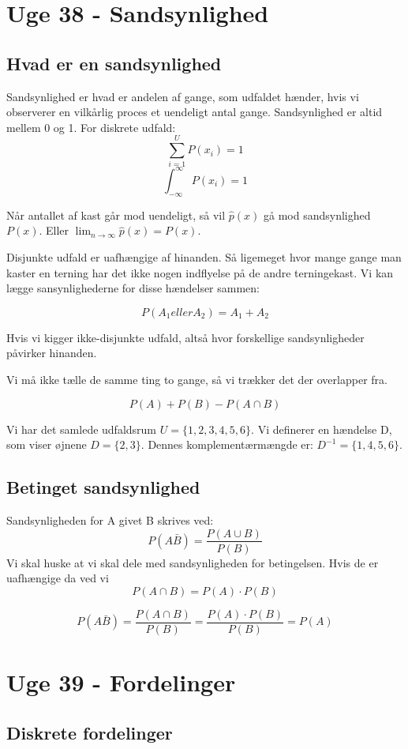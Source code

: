 \documentclass{article}
\begin{document}
    \newpage
\section{Uge 38 - Sandsynlighed}
\subsection{Hvad er en sandsynlighed}
Sandsynlighed er hvad er andelen af gange, som udfaldet hænder, hvis vi
observerer en vilkårlig proces et uendeligt antal gange. Sandsynlighed  er altid
mellem 0 og 1. For diskrete udfald:
$$\sum^U_{i=1} P(x_i) = 1 $$
$$\int^{\infty}_{-\infty} P(x_i) = 1 $$

Når antallet af kast går mod uendeligt, så vil $\hat{p}(x)$ gå mod sandsynlighed
$P(x)$. Eller $\lim_{n\rightarrow \infty} \hat{p}(x) = P(x)$.

Disjunkte udfald er uafhængige af hinanden. Så ligemeget hvor mange gange man
kaster en terning har det ikke nogen indflyelse på de andre terningekast. Vi kan
lægge sansynlighederne for disse hændelser sammen:

$$P(A_1 eller A_2) = A_1 + A_2$$

Hvis vi kigger ikke-disjunkte udfald, altså hvor forskellige sandsynligheder
påvirker hinanden.

Vi må ikke tælle de samme ting to gange, så vi trækker det der overlapper fra. 

$$P(A) + P(B) - P(A \cap B)$$

Vi har det samlede udfaldsrum $U = \{1, 2, 3,4,5,6\}$.
Vi definerer en hændelse D, som viser øjnene $D = \{2,3\}$. Dennes
komplementærmængde er: $D^{-1} = \{1,4,5,6\}$.

\subsection{Betinget sandsynlighed}
Sandsynligheden for A givet B skrives ved:
$$P (A \bar B) = \frac{P( A \cup B)}{P(B)}$$ Vi skal huske at vi skal dele med
sandsynligheden for betingelsen. Hvis de er uafhængige da ved vi
$$P(A \cap B) = P(A) \cdot P(B) $$

$$P(A \bar B) = \frac{P(A\cap B)}{P(B)} = \frac{P(A) \cdot P(B)}{P(B)} = P(A)$$

\newpage
\section{Uge 39 - Fordelinger}
\subsection{Diskrete fordelinger}
\end{document}
